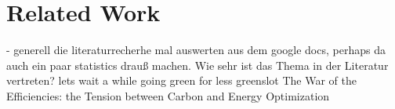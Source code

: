 \chapter{Related Work}

- generell die literaturrecherhe mal auswerten aus dem google docs, perhaps da auch ein paar statistics drauß machen. Wie sehr ist das Thema in der Literatur vertreten? 
lets wait a while
going green for less
greenslot
The War of the Efficiencies: the Tension between Carbon ​and Energy Optimization